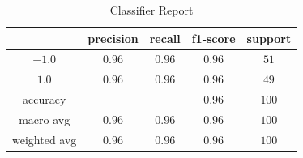 \documentclass[journal, a4paper]{IEEEtran}
\begin{document}
\begin{table}[!hbt]
	\begin{center}
	\caption{Classifier Report}
	\label{tab:simParameters}
	\begin{tabular}{|c|c|c|c|c|}
		\hline
		 & precision & recall & f1-score & support \\
		\hline
		$-1.0$ & $0.96$ & $0.96$ & $0.96$ & $51$\\
		\hline
		$1.0$ & $0.96$ & $0.96$ & $0.96$ & $49$\\
		\hline
		accuracy & & & $0.96$ & $100$\\
		\hline
        macro avg & $0.96$ & $0.96$ & $0.96$ & $100$\\
        \hline
        weighted avg & $0.96$ & $0.96$ & $0.96$ & $100$\\
        \hline
	\end{tabular}
	\end{center}
\end{table}\\
\end{document}
